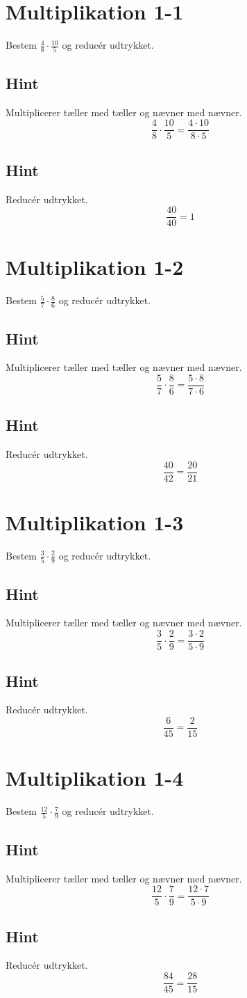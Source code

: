\documentclass{article}
\newenvironment{exercise}[1]{\newpage\section{#1}}{}
\newcommand{\answerbox}[1]{\fbox{$#1$}}
\newcommand{\hint}{\subsection*{Hint}}
\begin{document}
\tableofcontents
\newpage

\begin{exercise}{Multiplikation 1-1}

Bestem $\frac{4}{8} \cdot \frac{10}{5}$ og reducér udtrykket.

\answerbox{1}

\hint

Multiplicerer tæller med tæller og nævner med nævner.
\[
\frac{4}{8} \cdot \frac{10}{5} = \frac{4 \cdot 10}{8 \cdot 5} 
\]

\hint

Reducér udtrykket.
\[
\frac{40}{40} = 1
\]


\end{exercise}

\newpage

\begin{exercise}{Multiplikation 1-2}
	
	Bestem $\frac{5}{7} \cdot \frac{8}{6}$ og reducér udtrykket.
	
	\answerbox{\frac{20}{21}}
	
	\hint
	
	Multiplicerer tæller med tæller og nævner med nævner.
	\[
	\frac{5}{7} \cdot \frac{8}{6} = \frac{5 \cdot  8}{7 \cdot 6}
	\]
	
	\hint
	
	Reducér udtrykket.
	\[
	\frac{40}{42} = \frac{20}{21}
	\]
	
	
\end{exercise}

\newpage

\begin{exercise}{Multiplikation 1-3}
	
	Bestem $\frac{3}{5} \cdot \frac{2}{9}$ og reducér udtrykket.
	
	\answerbox{\frac{2}{15}}
	
	\hint
	
	Multiplicerer tæller med tæller og nævner med nævner.
	\[
	\frac{3}{5} \cdot \frac{2}{9}= \frac{3 \cdot 2}{5 \cdot 9} 
	\]
	
	\hint
	
	Reducér udtrykket.
	\[
	\frac{6}{45} = \frac{2}{15}
	\]
	
	
\end{exercise}

\newpage

\begin{exercise}{Multiplikation 1-4}
	
	Bestem $\frac{12}{5} \cdot \frac{7}{9}$ og reducér udtrykket.
	
	\answerbox{ \frac{28}{15}}
	
	\hint
	
	Multiplicerer tæller med tæller og nævner med nævner.
	\[
	\frac{12}{5} \cdot \frac{7}{9} = \frac{12 \cdot 7}{5 \cdot 9} 
	\]
	
	\hint
	
	Reducér udtrykket.
	\[
	\frac{84}{45} = \frac{28}{15}
	\]
	
	
\end{exercise}
\end{document}
